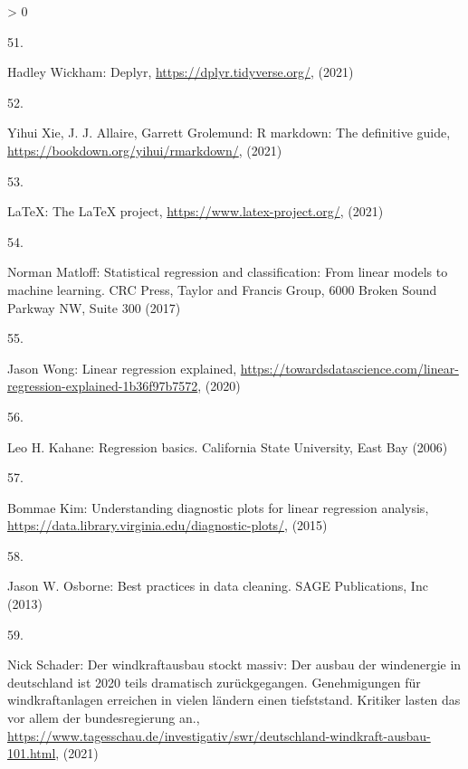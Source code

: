\documentclass[a4paper,11pt]{article}
\newlength{\cslhangindent}
\newlength{\csllabelwidth}
\newenvironment{CSLReferences}[3] %
 {%
  \setlength{\parindent}{0pt}
  \ifodd #1 \everypar{\setlength{\hangindent}{\cslhangindent}}\ignorespaces\fi
  \ifnum #2 > 0
  \setlength{\parskip}{#2\baselineskip}
  \fi
 }%
 {}
\newcommand{\CSLLeftMargin}[1]{\parbox[t]{\maxof{\widthof{#1}}{\csllabelwidth}}{#1}}
\newcommand{\CSLRightInline}[1]{\parbox[t]{\linewidth}{#1}}
\begin{document}
\begin{CSLReferences}{0}{0}
\leavevmode\hypertarget{ref-HadleyWickham.2021}{}%
\CSLLeftMargin{51. }
\CSLRightInline{Hadley Wickham: Deplyr, \url{https://dplyr.tidyverse.org/}, (2021)}

\leavevmode\hypertarget{ref-YihuiXieJ.J.AllaireGarrettGrolemund.2021}{}%
\CSLLeftMargin{52. }
\CSLRightInline{Yihui Xie, J. J. Allaire, Garrett Grolemund: R markdown: The definitive guide, \url{https://bookdown.org/yihui/rmarkdown/}, (2021)}

\leavevmode\hypertarget{ref-LaTeX.2021}{}%
\CSLLeftMargin{53. }
\CSLRightInline{LaTeX: The LaTeX project, \url{https://www.latex-project.org/}, (2021)}

\leavevmode\hypertarget{ref-NormanMatloff.2017}{}%
\CSLLeftMargin{54. }
\CSLRightInline{Norman Matloff: Statistical regression and classification: From linear models to machine learning. {CRC Press, Taylor and Francis Group}, 6000 Broken Sound Parkway NW, Suite 300 (2017)}

\leavevmode\hypertarget{ref-JasonWong.2020}{}%
\CSLLeftMargin{55. }
\CSLRightInline{Jason Wong: Linear regression explained, \url{https://towardsdatascience.com/linear-regression-explained-1b36f97b7572}, (2020)}

\leavevmode\hypertarget{ref-LeoH.Kahane.2006}{}%
\CSLLeftMargin{56. }
\CSLRightInline{Leo H. Kahane: Regression basics. {California State University, East Bay} (2006)}

\leavevmode\hypertarget{ref-BommaeKim.2015}{}%
\CSLLeftMargin{57. }
\CSLRightInline{Bommae Kim: Understanding diagnostic plots for linear regression analysis, \url{https://data.library.virginia.edu/diagnostic-plots/}, (2015)}

\leavevmode\hypertarget{ref-JasonW.Osborne.2013}{}%
\CSLLeftMargin{58. }
\CSLRightInline{Jason W. Osborne: Best practices in data cleaning. {SAGE Publications, Inc} (2013)}

\leavevmode\hypertarget{ref-NickSchader.2021}{}%
\CSLLeftMargin{59. }
\CSLRightInline{Nick Schader: Der windkraftausbau stockt massiv: Der ausbau der windenergie in deutschland ist 2020 teils dramatisch zur{ü}ckgegangen. Genehmigungen f{ü}r windkraftanlagen erreichen in vielen l{ä}ndern einen tiefststand. Kritiker lasten das vor allem der bundesregierung an., \url{https://www.tagesschau.de/investigativ/swr/deutschland-windkraft-ausbau-101.html}, (2021)}

\end{CSLReferences}
\indent
\setlength{\parindent}{17pt}
\setlength{\leftskip}{0pt}
\setlength{\parskip}{0pt}
\end{document}
